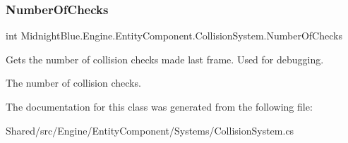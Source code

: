 \subsubsection{\texorpdfstring{Number\+Of\+Checks}{NumberOfChecks}}
{\footnotesize\ttfamily int Midnight\+Blue.\+Engine.\+Entity\+Component.\+Collision\+System.\+Number\+Of\+Checks\hspace{0.3cm}{\ttfamily [get]}}



Gets the number of collision checks made last frame. Used for debugging. 

The number of collision checks.

The documentation for this class was generated from the following file\+:\begin{DoxyCompactItemize}
\item 
Shared/src/\+Engine/\+Entity\+Component/\+Systems/Collision\+System.\+cs\end{DoxyCompactItemize}
